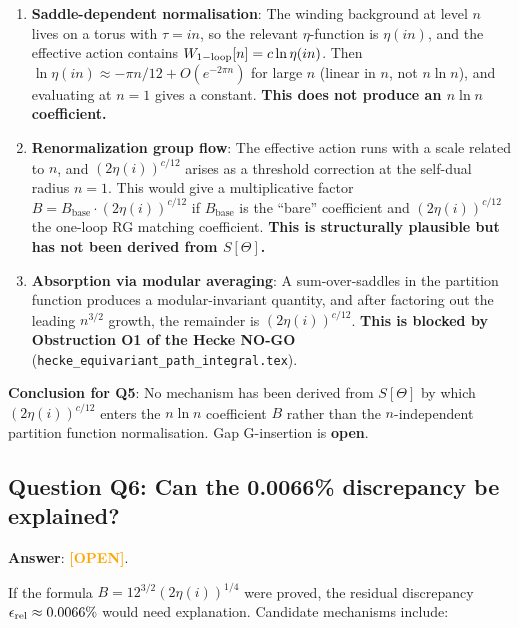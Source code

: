 \documentclass[12pt,a4paper]{article}
\theoremstyle{definition}
\theoremstyle{remark}
\newcommand{\OPEN}{\textcolor{orange}{\textbf{[OPEN]}}}
\newcommand{\Bbase}{B_{\mathrm{base}}}
\begin{document}
\begin{enumerate}
  \item \textbf{Saddle-dependent normalisation}: The winding background at
        level $n$ lives on a torus with $\tau = in$, so the relevant
        $\eta$-function is $\eta(in)$, and the effective action contains
        $W_{\rm 1-loop}[n] = c\ln\eta(in)$.  Then
        $\ln\eta(in) \approx -\pi n/12 + O(e^{-2\pi n})$ for large $n$
        (linear in $n$, not $n\ln n$), and evaluating at $n=1$ gives a
        constant.  \textbf{This does not produce an $n\ln n$ coefficient.}

  \item \textbf{Renormalization group flow}: The effective action runs with
        a scale related to $n$, and $(2\eta(i))^{c/12}$ arises as a
        threshold correction at the self-dual radius $n = 1$.  This would
        give a multiplicative factor $B = \Bbase\cdot(2\eta(i))^{c/12}$
        if $\Bbase$ is the ``bare'' coefficient and $(2\eta(i))^{c/12}$
        the one-loop RG matching coefficient.  \textbf{This is structurally
        plausible but has not been derived from $S[\Theta]$.}

  \item \textbf{Absorption via modular averaging}: A sum-over-saddles in the
        partition function produces a modular-invariant quantity, and after
        factoring out the leading $n^{3/2}$ growth, the remainder is
        $(2\eta(i))^{c/12}$.  \textbf{This is blocked by Obstruction O1 of
        the Hecke NO-GO} (\texttt{hecke\_equivariant\_path\_integral.tex}).
\end{enumerate}

\begin{warnbox}
\textbf{Conclusion for Q5}: No mechanism has been derived from $S[\Theta]$
by which $(2\eta(i))^{c/12}$ enters the $n\ln n$ coefficient $B$ rather
than the $n$-independent partition function normalisation.  Gap G-insertion
is \textbf{open}.
\end{warnbox}

\subsection{Question Q6: Can the 0.0066\% discrepancy be explained?}
\label{sec:q6}

\noindent\textbf{Answer}: \OPEN.

If the formula $B = 12^{3/2}(2\eta(i))^{1/4}$ were proved, the residual
discrepancy $\epsilon_{\rm rel} \approx 0.0066\%$ would need explanation.
Candidate mechanisms include:
\end{document}
